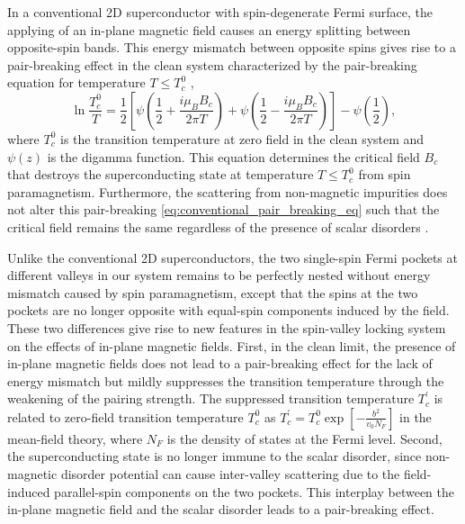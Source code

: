 In a conventional 2D superconductor with spin-degenerate Fermi surface,
the applying of an in-plane magnetic field causes an energy splitting
between opposite-spin bands.
This energy mismatch between opposite
spins gives rise to a pair-breaking effect in the clean system characterized
by the pair-breaking equation for temperature
$T \leq T_c^0$
\cite{Maki01061964},
\begin{equation}
  \label{eq:conventional_pair_breaking_eq}
  \ln{\frac{T_c^0}{T}}
  = \frac{1}{2} \left[ψ(\frac{1}{2}+\frac{iμ_{B}B_{c}}{2π T})+ψ(\frac{1}{2}-\frac{iμ_{B}B_{c}}{2π T})\right]-ψ(\frac{1}{2}),
\end{equation}
where $T_{c}^{0}$ is the transition temperature at zero field in
the clean system and $ψ(z)$ is the digamma function.
This equation determines the critical field $B_{c}$ that destroys the superconducting
state at temperature $T\leq T_{c}^{0}$ from spin paramagnetism.
Furthermore, the scattering from non-magnetic impurities does not alter this pair-breaking
\cref{eq:conventional_pair_breaking_eq} such that the
critical field remains the same regardless of the presence of scalar
disorders \cite{Maki01061964}.

Unlike the conventional 2D superconductors, the two single-spin Fermi
pockets at different valleys in our system remains to be perfectly
nested without energy mismatch caused by spin paramagnetism, except
that the spins at the two pockets are no longer opposite with equal-spin
components induced by the field.
These two differences give rise to new features in the spin-valley locking system on the effects of in-plane
magnetic fields.
First, in the clean limit, the presence of in-plane
magnetic fields does not lead to a pair-breaking effect for the lack
of energy mismatch but mildly suppresses the transition temperature
through the weakening of the pairing strength.
The suppressed transition
temperature $T_{c}^{'}$ is related to zero-field transition temperature
$T_{c}^{0}$ as $T_{c}^{'}=T_{c}^{0}\exp\left[-\frac{b^{2}}{v_{0}N_{F}}\right]$
in the mean-field theory, where $N_{F}$ is the density of states
at the Fermi level.
Second, the superconducting state is no longer
immune to the scalar disorder, since non-magnetic disorder potential
can cause inter-valley scattering due to the field-induced parallel-spin
components on the two pockets.
This interplay between the in-plane
magnetic field and the scalar disorder leads to a pair-breaking effect.

